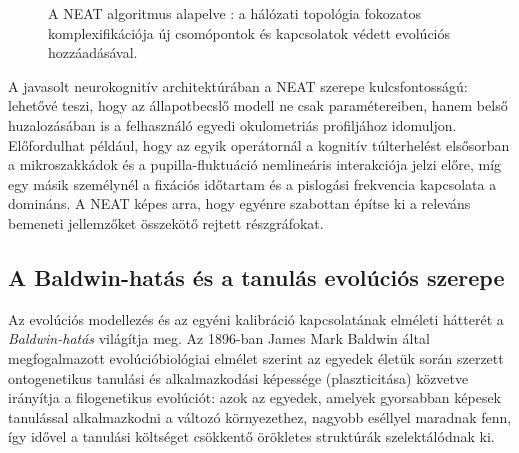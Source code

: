 \documentclass[12pt,a4paper,oneside]{book}
\begin{document}
\begin{figure}[H]
    \centering
    \caption{A NEAT algoritmus alapelve \cite{stanley2002}: a hálózati topológia fokozatos komplexifikációja új csomópontok és kapcsolatok védett evolúciós hozzáadásával.}
    \label{fig:neat_evolution}
\end{figure}

A javasolt neurokognitív architektúrában a NEAT szerepe kulcsfontosságú: lehetővé teszi, hogy az állapotbecslő modell ne csak paramétereiben, hanem belső huzalozásában is a felhasználó egyedi okulometriás profiljához idomuljon. Előfordulhat például, hogy az egyik operátornál a kognitív túlterhelést elsősorban a mikroszakkádok és a pupilla-fluktuáció nemlineáris interakciója jelzi előre, míg egy másik személynél a fixációs időtartam és a pislogási frekvencia kapcsolata a domináns. A NEAT képes arra, hogy egyénre szabottan építse ki a releváns bemeneti jellemzőket összekötő rejtett részgráfokat.

\subsection{A Baldwin-hatás és a tanulás evolúciós szerepe}

Az evolúciós modellezés és az egyéni kalibráció kapcsolatának elméleti hátterét a \emph{Baldwin-hatás} világítja meg. Az 1896-ban James Mark Baldwin által megfogalmazott evolúcióbiológiai elmélet szerint az egyedek életük során szerzett ontogenetikus tanulási és alkalmazkodási képessége (plaszticitása) közvetve irányítja a filogenetikus evolúciót: azok az egyedek, amelyek gyorsabban képesek tanulással alkalmazkodni a változó környezethez, nagyobb eséllyel maradnak fenn, így idővel a tanulási költséget csökkentő örökletes struktúrák szelektálódnak ki.
\end{document}
